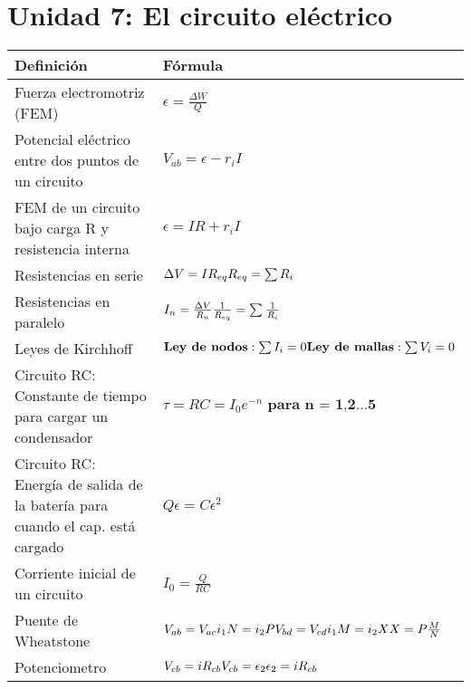 \documentclass[a4paper,12pt]{article}
\begin{document}
\section{Unidad 7: El circuito eléctrico}
\renewcommand{\arraystretch}{1.5}
\begin{center}
	\begin{tabularx}{\textwidth}{|X|X|}
		\hline
		\textbf{Definición} & \textbf{Fórmula} \\ \hline
		Fuerza electromotriz (FEM) & $\epsilon = \frac{\Delta W}{Q}$ \\ \hline
		Potencial eléctrico entre dos puntos de un circuito & ${V_{ab}} = \epsilon - {r_i}I$ \\ \hline
		FEM de un circuito bajo carga R y resistencia interna & $\epsilon = I R + {r_i}I$ \\ \hline
		Resistencias en serie & $\Delta V = I {R_{eq}} \newline {R_{eq}} = \sum R_i$ \\ \hline
		Resistencias en paralelo & ${I_n} = \frac{\Delta V}{R_n} \newline \frac {1}{R_{eq}} = \sum_{} \frac{1}{R_i}$ \\ \hline
		Leyes de Kirchhoff & $\textbf{Ley de nodos}: \sum {I_i} = 0 \newline \newline \textbf{Ley de mallas}: \sum {V_i} = 0$ \\ \hline
		Circuito RC: Constante de tiempo para cargar un condensador& $\tau = RC = I_0 e^{-n} \textbf{ para n = 1,2...5}$ \\ \hline
		Circuito RC: Energía de salida de  la batería para cuando el cap. está cargado & $Q \epsilon = C {\epsilon}^2$ \\ \hline
		Corriente inicial de un circuito & ${I_0} = \frac{Q}{RC}$ \\ \hline
		Puente de Wheatstone & ${V_{ab}} = {V_{ac}}{i_1} \newline N = {i_2} P \newline V_{bd} = V_{cd} {i_1} \newline M = {i_2} X \newline X = P \frac{M}{N} $ \\ \hline
		Potenciometro & $V_{cb} = i{R_{cb}} \newline V_{cb} = \epsilon_2 \newline \epsilon_2 = i{R_{cb}}$ \\ \hline
		
	\end{tabularx}
\end{center}
\end{document}
